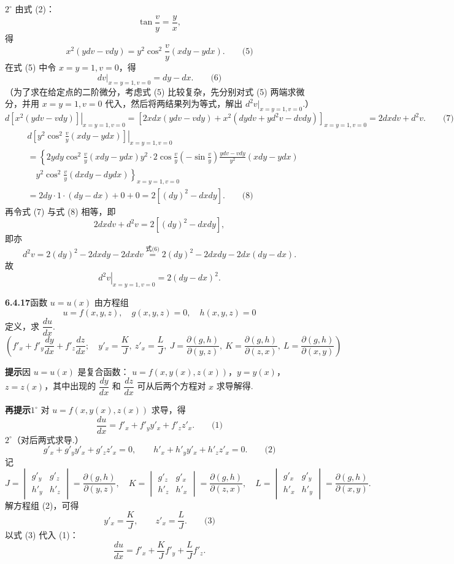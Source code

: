 \documentclass[UTF8,12pt,a4paper,fontset=fandol]{ctexart}
\begin{document}
$2^\circ$ 由式 (2)：
\[
  \tan\frac vy=\frac yx,
\]
得
\[
  x^2(ydv-vdy)=y^2\cos^2\frac vy(xdy-ydx). \qquad\text{(5)}
\]
在式 (5) 中令 $x=y=1,v=0$，得
\[
  \left.dv\right|_{x=y=1,v=0}=dy-dx. \qquad\text{(6)}
\]
（为了求在给定点的二阶微分，考虑式 (5) 比较复杂，先分别对式 (5) 两端求微分，并用 $x=y=1,v=0$ 代入，然后将两结果列为等式，解出 $d^2v|_{x=y=1,v=0}$.）
\[
\left.d[x^2(ydv-vdy)]\right|_{x=y=1,v=0}
=
\left[2xdx(ydv-vdy)+x^2(dydv+yd^2v-dvdy)\right]_{x=y=1,v=0}
=2dxdv+d^2v. \qquad\text{(7)}
\]
\[
\begin{aligned}
&\left.d\left[y^2\cos^2\frac vy(xdy-ydx)\right]\right|_{x=y=1,v=0}\\
&=\left\{2ydy\cos^2\frac vy(xdy-ydx)
y^2\cdot 2\cos\frac vy\left(-\sin\frac vy\right)
\frac{ydv-vdy}{y^2}(xdy-ydx)\right.\\
&\quad\left.
y^2\cos^2\frac vy(dxdy-dydx)\right\}_{x=y=1,v=0}\\
&=2dy\cdot1\cdot(dy-dx)+0+0
=2[(dy)^2-dxdy]. \qquad\text{(8)}
\end{aligned}
\]
再令式 (7) 与式 (8) 相等，即
\[
  2dxdv+d^2v=2[(dy)^2-dxdy],
\]
即亦
\[
  d^2v=2(dy)^2-2dxdy-2dxdv
  \overset{\text{式(6)}}{=}
  2(dy)^2-2dxdy-2dx(dy-dx).
\]
故
\[
  \left.d^2v\right|_{x=y=1,v=0}=2(dy-dx)^2.
\]

\noindent\textbf{6.4.17}\quad 函数 $u=u(x)$ 由方程组
\[
  u=f(x,y,z),\quad g(x,y,z)=0,\quad h(x,y,z)=0
\]
定义，求 $\dfrac{du}{dx}$.
\[
  \left(f'_x+f'_y\frac{dy}{dx}+f'_z\frac{dz}{dx};\quad
  y'_x=\frac KJ,\ z'_x=\frac LJ,\ 
  J=\frac{\partial(g,h)}{\partial(y,z)},\
  K=\frac{\partial(g,h)}{\partial(z,x)},\
  L=\frac{\partial(g,h)}{\partial(x,y)}
  \right)
\]

\noindent\textbf{提示}\quad 因 $u=u(x)$ 是复合函数：
$u=f(x,y(x),z(x))$，$y=y(x)$，$z=z(x)$，其中出现的
$\dfrac{dy}{dx}$ 和 $\dfrac{dz}{dx}$ 可从后两个方程对 $x$ 求导解得.

\noindent\textbf{再提示}\quad $1^\circ$ 对 $u=f(x,y(x),z(x))$ 求导，得
\[
  \frac{du}{dx}=f'_x+f'_y y'_x+f'_z z'_x. \qquad\text{(1)}
\]
$2^\circ$（对后两式求导.）
\[
  g'_x+g'_y y'_x+g'_z z'_x=0,\qquad
  h'_x+h'_y y'_x+h'_z z'_x=0. \qquad\text{(2)}
\]
记
\[
  J=
  \begin{vmatrix}
    g'_y&g'_z\\
    h'_y&h'_z
  \end{vmatrix}
  =
  \frac{\partial(g,h)}{\partial(y,z)},\quad
  K=
  \begin{vmatrix}
    g'_z&g'_x\\
    h'_z&h'_x
  \end{vmatrix}
  =
  \frac{\partial(g,h)}{\partial(z,x)},\quad
  L=
  \begin{vmatrix}
    g'_x&g'_y\\
    h'_x&h'_y
  \end{vmatrix}
  =
  \frac{\partial(g,h)}{\partial(x,y)}.
\]
解方程组 (2)，可得
\[
  y'_x=\frac KJ,\qquad z'_x=\frac LJ. \qquad\text{(3)}
\]
以式 (3) 代入 (1)：
\[
  \frac{du}{dx}=f'_x+\frac KJ f'_y+\frac LJ f'_z.
\]
\end{document}
